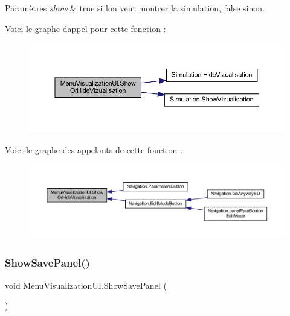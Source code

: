 \begin{DoxyParams}{Paramètres}
{\em show} & true si l\textquotesingle{}on veut montrer la simulation, false sinon.\\
\hline
\end{DoxyParams}
Voici le graphe d\textquotesingle{}appel pour cette fonction \+:\nopagebreak
\begin{figure}[H]
\begin{center}
\leavevmode
\includegraphics[width=350pt]{class_menu_visualization_u_i_ab06398a58bc8438ead7172d9e09b8bca_cgraph}
\end{center}
\end{figure}
Voici le graphe des appelants de cette fonction \+:
\nopagebreak
\begin{figure}[H]
\begin{center}
\leavevmode
\includegraphics[width=350pt]{class_menu_visualization_u_i_ab06398a58bc8438ead7172d9e09b8bca_icgraph}
\end{center}
\end{figure}
\mbox{\label{class_menu_visualization_u_i_aabfef8a72ef59e04916f6d95a1274431}} 
\subsubsection{\texorpdfstring{Show\+Save\+Panel()}{ShowSavePanel()}}
{\footnotesize\ttfamily void Menu\+Visualization\+U\+I.\+Show\+Save\+Panel (\begin{DoxyParamCaption}{ }\end{DoxyParamCaption})\hspace{0.3cm}{\ttfamily [inline]}}



